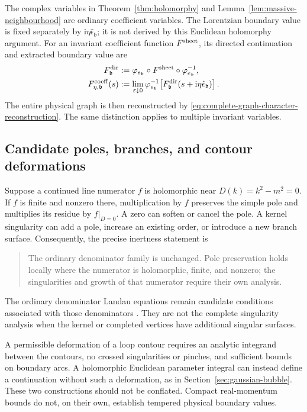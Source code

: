 \documentclass[final,5p,times,twocolumn,numbers,nopreprintline]{elsarticle}
\numberwithin{equation}{section}
\theoremstyle{definition}
\theoremstyle{remark}
\newcommand{\ii}{\mathrm i}
\newcommand{\bb}{\mathfrak b}
\newcommand{\ee}{e_{\bb}}
\newcommand{\epsvec}{\hat\epsilon_{\bb}}
\newcommand{\embed}{\varphi_{\ee}}
\begin{document}
The complex variables in Theorem~\ref{thm:holomorphy} and
Lemma~\ref{lem:massive-neighbourhood} are ordinary coefficient
variables. The Lorentzian boundary value is fixed separately by
\(\ii\eta\epsvec\); it is not derived by this Euclidean
holomorphy argument. For an invariant coefficient function
\(F^{\rm sheet}\), its directed continuation and extracted
boundary value are
\begin{align}
 F^{\rm dir}_{\bb}
   &:=\embed\circ F^{\rm sheet}\circ\embed^{-1},
       \nonumber\\
 F^{\rm coeff}_{\eta,\bb}(s)
   &:=\lim_{\varepsilon\downarrow0}
       \embed^{-1}\!\left[
       F^{\rm dir}_{\bb}(s+\ii\eta\epsvec)\right].
 \label{eq:analytic-function-directed-interface}
\end{align}
The entire physical graph is then reconstructed by
\eqref{eq:complete-graph-character-reconstruction}.
The same distinction applies to multiple invariant variables.

\subsection{Candidate poles, branches, and contour deformations}

Suppose a continued line numerator \(f\) is holomorphic near
\(D(k)=k^2-m^2=0\). If \(f\) is finite and nonzero there,
multiplication by \(f\) preserves the simple pole and multiplies
its residue by \(f|_{D=0}\). A zero can soften or cancel the pole.
A kernel singularity can add a pole, increase an existing order,
or introduce a new branch surface. Consequently, the precise
inertness statement is
\begin{quote}
The ordinary denominator family is unchanged. Pole preservation
holds locally where the numerator is holomorphic, finite, and
nonzero; the singularities and growth of that numerator require
their own analysis.
\end{quote}

The ordinary denominator Landau equations remain candidate
conditions associated with those denominators
\cite{Landau1959}. They are not the complete singularity
analysis when the kernel or completed vertices have additional
singular surfaces.

A permissible deformation of a loop contour requires an analytic
integrand between the contours, no crossed singularities or
pinches, and sufficient bounds on boundary arcs. A holomorphic
Euclidean parameter integral can instead define a continuation
without such a deformation, as in
Section~\ref{sec:gaussian-bubble}.
These two constructions should not be conflated.
Compact real-momentum bounds do not, on their own, establish
tempered physical boundary values.
\end{document}
